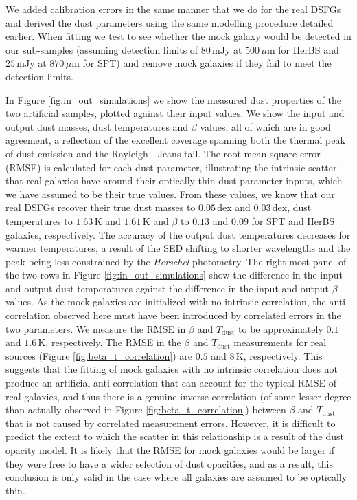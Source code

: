We added calibration errors in the same manner that we do for the real DSFGs and derived the dust parameters using the same modelling procedure detailed earlier. When fitting we test to see whether the mock galaxy would be detected in our sub-samples (assuming detection limits of $80\,$mJy at $500\,\mu$m for HerBS and $25\,$mJy at $870\,\mu$m for SPT) and remove mock galaxies if they fail to meet the detection limits.

In Figure \ref{fig:in_out_simulations} we show the measured dust properties of the two artificial samples, plotted against their input values. We show the input and output dust masses, dust temperatures and $\beta$ values, all of which are in good agreement, a reflection of the excellent coverage spanning both the thermal peak of dust emission and the Rayleigh - Jeans tail. The root mean square error (RMSE) is calculated for each dust parameter, illustrating the intrinsic scatter that real galaxies have around their optically thin dust parameter inputs, which we have assumed to be their true values. From these values, we know that our real DSFGs recover their true dust masses to $0.05\,$dex and $0.03\,$dex, dust temperatures to $1.63\,$K and $1.61\,$K and $\beta$ to $0.13$ and $0.09$ for SPT and HerBS galaxies, respectively. The accuracy of the output dust temperatures decreases for warmer temperatures, a result of the SED shifting to shorter wavelengths and the peak being less constrained by the \textit{Herschel} photometry. The right-most panel of the two rows in Figure \ref{fig:in_out_simulations} show the difference in the input and output dust temperatures against the difference in the input and output $\beta$ values. As the mock galaxies are initialized with no intrinsic correlation, the anti-correlation observed here must have been introduced by correlated errors in the two parameters. We measure the RMSE in $\beta$ and $T_\textrm{dust}$ to be approximately $0.1$ and $1.6\,$K, respectively. The RMSE in the $\beta$ and $T_\textrm{dust}$ measurements for real sources (Figure \ref{fig:beta_t_correlation}) are $0.5$ and $8\,$K, respectively. This suggests that the fitting of mock galaxies with no intrinsic correlation does not produce an artificial anti-correlation that can account for the typical RMSE of real galaxies, and thus there is a genuine inverse correlation (of some lesser degree than actually observed in Figure \ref{fig:beta_t_correlation}) between $\beta$ and $T_\textrm{dust}$ that is not caused by correlated measurement errors. However, it is difficult to predict the extent to which the scatter in this relationship is a result of the dust opacity model. It is likely that the RMSE for mock galaxies would be larger if they were free to have a wider selection of dust opacities, and as a result, this conclusion is only valid in the case where all galaxies are assumed to be optically thin.

